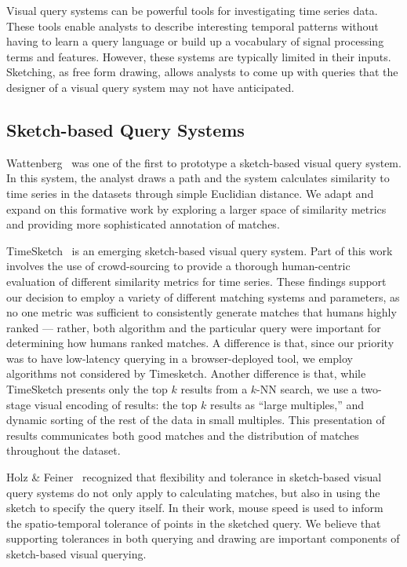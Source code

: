 Visual query systems can be powerful tools for investigating time series data. These tools enable analysts to describe interesting temporal patterns without having to learn a query language or build up a vocabulary of signal processing terms and features. However, these systems are typically limited in their inputs. Sketching, as free form drawing, allows analysts to come up with queries that the designer of a visual query system may not have anticipated.

\subsection{Sketch-based Query Systems}

Wattenberg~\cite{wattenberg2001sketching} was one of the first to prototype a sketch-based visual query system. In this system, the analyst draws a path and the system calculates similarity to time series in the datasets through simple Euclidian distance. We adapt and expand on this formative work by exploring a larger space of similarity metrics and providing more sophisticated annotation of matches.

TimeSketch~\cite{eichmann2015evaluating} is an emerging sketch-based visual query system. Part of this work involves the use of crowd-sourcing to provide a thorough human-centric evaluation of different similarity metrics for time series. These findings support our decision to employ a variety of different matching systems and parameters, as no one metric was sufficient to consistently generate matches that humans highly ranked --- rather, both algorithm and the particular query were important for determining how humans ranked matches. A difference is that, since our priority was to have low-latency querying in a browser-deployed tool, we employ algorithms not considered by Timesketch. Another difference is that, while TimeSketch presents only the top $k$ results from a $k$-NN search, we use a two-stage visual encoding of results: the top $k$ results as ``large multiples,'' and dynamic sorting of the rest of the data in small multiples. This presentation of results communicates both good matches and the distribution of matches throughout the dataset.

Holz \& Feiner~\cite{holz2009relaxed} recognized that flexibility and tolerance in sketch-based visual query systems do not only apply to calculating matches, but also in using the sketch to specify the query itself. In their work, mouse speed is used to inform the spatio-temporal tolerance of points in the sketched query. We believe that supporting tolerances in both querying and drawing are important components of sketch-based visual querying.

